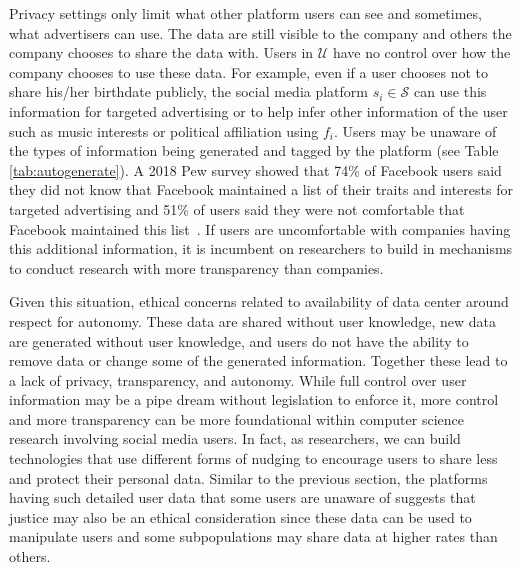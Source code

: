\documentclass[11pt]{article} %
\begin{document}
Privacy settings only limit what other platform users can see and sometimes, what advertisers can use. The data are still visible to the company and others the company chooses to share the data with. Users in $\mathcal{U}$ have no control over how the company chooses to use these data. For example, even if a user chooses not to share his/her birthdate publicly, the social media platform $s_i \in \mathcal{S}$ can use this information for targeted advertising or to help infer other information of the user such as music interests or political affiliation using $f_i$. Users may be unaware of the types of information being generated and tagged by the platform (see Table \ref{tab:autogenerate}). A 2018 Pew survey showed that 74\% of Facebook users said they did not know that Facebook maintained a list of their traits and interests for targeted advertising and 51\% of users said they were not comfortable that Facebook maintained this list~\cite{FB_targetad}. If users are uncomfortable with companies having this additional information, it is incumbent on researchers to build in mechanisms to conduct research with more transparency than companies. 

Given this situation, ethical concerns related to availability of data center around respect for autonomy. These data are shared without user knowledge, new data are generated without user knowledge, and users do not have the ability to remove data or change some of the generated information. Together these lead to a lack of privacy, transparency, and autonomy. While full control over user information may be a pipe dream without legislation to enforce it, more control and more transparency can be more foundational within computer science research involving social media users. In fact, as researchers, we can build technologies that use different forms of nudging \cite{thaler2009} to encourage users to share less and protect their personal data.
Similar to the previous section, the platforms having such detailed user data that some users are unaware of suggests that justice may also be an ethical consideration since these data can be used to manipulate users and some subpopulations may share data at higher rates than others. 
\end{document}
